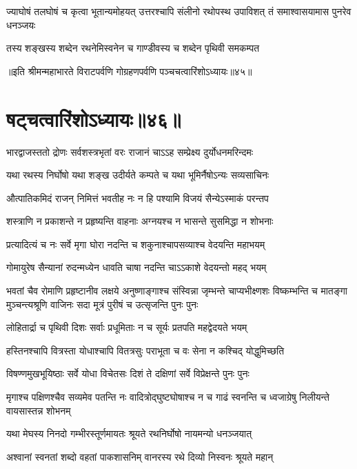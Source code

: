 \threelineshloka
{ज्याघोषं तलघोषं च कृत्वा भूतान्यमोहयत्}
{उत्तरश्चापि संलीनो रथोपस्थ उपाविशत्}
{तं समाश्वासयामास पुनरेव धनञ्जयः}


\twolineshloka
{तस्य शङ्खस्य शब्देन रथनेमिस्वनेन च}
{गाण्डीवस्य च शब्देन पृथिवी समकम्पत}

॥इति श्रीमन्महाभारते विराटपर्वणि गोग्रहणपर्वणि पञ्चचत्वारिंशोऽध्यायः॥४५॥

\chapter{षट्चत्वारिंशोऽध्यायः॥४६॥}

\twolineshloka
{भारद्वाजस्ततो द्रोणः सर्वशस्त्रभृतां वरः}
{राजानं चाऽऽह सम्प्रेक्ष्य दुर्योधनमरिन्दमः}


\twolineshloka
{यथा रथस्य निर्घोषो यथा शङ्ख उदीर्यते}
{कम्पते च यथा भूमिर्नैषोऽन्यः सव्यसाचिनः}


\twolineshloka
{औत्पातिकमिदं राजन् निमित्तं भवतीह नः}
{न हि पश्यामि विजयं सैन्येऽस्माकं परन्तप}


\twolineshloka
{शस्त्राणि न प्रकाशन्ते न प्रहृष्यन्ति वाहनाः}
{अग्नयश्च न भासन्ते सुसमिद्धा न शोभनाः}


\twolineshloka
{प्रत्यादित्यं च नः सर्वे मृगा घोरा नदन्ति च}
{शकुनाश्चापसव्याश्च वेदयन्ति महाभयम्}


\twolineshloka
{गोमायुरेष सैन्यानां रुदन्मध्येन धावति}
{चाषा नदन्ति चाऽऽकाशे वेदयन्तो महद् भयम्}


\onelineshloka
{भवतां चैव रोमाणि प्रहृष्टानीव लक्षये}
\threelineshloka
{अनुष्णाङ्गाश्च संस्विन्ना जृम्भन्ते चाप्यभीक्ष्णशः}
{विष्कम्भन्ति च मातङ्गा मुञ्चन्त्यश्रूणि वाजिनः}
{सदा मूत्रं पुरीषं च उत्सृजन्ति पुनः पुनः}


\twolineshloka
{लोहितार्द्रा च पृथिवी दिशः सर्वाः प्रधूमिताः}
{न च सूर्यः प्रतपति महद्वेदयते भयम्}


\twolineshloka
{हस्तिनश्चापि वित्रस्ता योधाश्चापि वितत्रसुः}
{पराभूता च वः सेना न कश्चिद् योद्धुमिच्छति}


\twolineshloka
{विषण्णमुखभूयिष्ठाः सर्वे योधा विचेतसः}
{दिशं ते दक्षिणां सर्वे विप्रेक्षन्ते पुनः पुनः}


\threelineshloka
{मृगाश्च पक्षिणश्चैव सव्यमेव पतन्ति नः}
{वादित्रोद्घुष्टघोषाश्च न च गाढं स्वनन्ति च}
{ध्वजाग्रेषु निलीयन्ते वायसास्तन्न शोभनम्}


\twolineshloka
{यथा मेघस्य निनदो गम्भीरस्तूर्णमायतः}
{श्रूयते रथनिर्घोषो नायमन्यो धनञ्जयात्}


\twolineshloka
{अश्वानां स्वनतां शब्दो वहतां पाकशासनिम्}
{वानरस्य रथे दिव्यो निस्वनः श्रूयते महान्}


